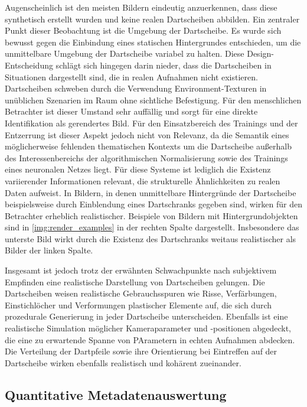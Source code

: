 Augenscheinlich ist den meisten Bildern eindeutig anzuerkennen, dass diese synthetisch erstellt wurden und keine realen Dartscheiben abbilden. Ein zentraler Punkt dieser Beobachtung ist die Umgebung der Dartscheibe. Es wurde sich bewusst gegen die Einbindung eines statischen Hintergrundes entschieden, um die unmittelbare Umgebung der Dartscheibe variabel zu halten. Diese Design-Entscheidung schlägt sich hingegen darin nieder, dass die Dartscheiben in Situationen dargestellt sind, die in realen Aufnahmen nicht existieren. Dartscheiben schweben durch die Verwendung Environment-Texturen in unüblichen Szenarien im Raum ohne sichtliche Befestigung. Für den menschlichen Betrachter ist dieser Umstand sehr auffällig und sorgt für eine direkte Identifikation als gerendertes Bild. Für den Einsatzbereich des Trainings und der Entzerrung ist dieser Aspekt jedoch nicht von Relevanz, da die Semantik eines möglicherweise fehlenden thematischen Kontexts um die Dartscheibe außerhalb des Interessenbereichs der algorithmischen Normalisierung sowie des Trainings eines neuronalen Netzes liegt. Für diese Systeme ist lediglich die Existenz variierender Informationen relevant, die strukturelle Ähnlichkeiten zu realen Daten aufweist. In Bildern, in denen unmittelbare Hintergründe der Dartscheibe beispielsweise durch Einblendung eines Dartschranks gegeben sind, wirken für den Betrachter erheblich realistischer. Beispiele von Bildern mit Hintergrundobjekten sind in \autoref{img:render_examples} in der rechten Spalte dargestellt. Insbesondere das unterste Bild wirkt durch die Existenz des Dartschranks weitaus realistischer als Bilder der linken Spalte.

Insgesamt ist jedoch trotz der erwähnten Schwachpunkte nach subjektivem Empfinden eine realistische Darstellung von Dartscheiben gelungen. Die Dartscheiben weisen realistische Gebrauchsspuren wie Risse, Verfärbungen, Einstichlöcher und Verformungen plastischer Elemente auf, die sich durch prozedurale Generierung in jeder Dartscheibe unterscheiden. Ebenfalls ist eine realistische Simulation möglicher Kameraparameter und -positionen abgedeckt, die eine zu erwartende Spanne von PArametern in echten Aufnahmen abdecken. Die Verteilung der Dartpfeile sowie ihre Orientierung bei Eintreffen auf der Dartscheibe wirken ebenfalls realistisch und kohärent zueinander.

\subsection{Quantitative Metadatenauswertung} %
\label{sec:metadaten}

